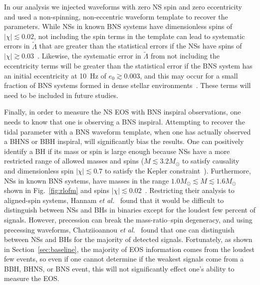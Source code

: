 \documentclass[twocolumn,prd,amssymb,aps,nofootinbib,showpacs,epsf]{revtex4}
\begin{document}

In our analysis we injected waveforms with zero NS spin and zero eccentricity and used a non-spinning, non-eccentric waveform template to recover the parameters. While NSs in known BNS systems have dimensionless spins of $|\chi| \lesssim 0.02$, not including the spin terms in the template can lead to systematic errors in $\tilde\Lambda$ that are greater than the statistical errors if the NSs have spins of $|\chi| \gtrsim 0.03$~\cite{Favata2014}. Likewise, the systematic error in $\tilde\Lambda$ from not including the eccentricity terms will be greater than the statistical error if the BNS system has an initial eccentricity at 10~Hz of $e_0 \gtrsim 0.003$, and this may occur for a small fraction of BNS systems formed in dense stellar environments~\cite{Favata2014}. These terms will need to be included in future studies.

Finally, in order to measure the NS EOS with BNS inspiral observations, one needs to know that one is observing a BNS inspiral. Attempting to recover the tidal parameter with a BNS waveform template, when one has actually observed a BHNS or BBH inspiral, will significantly bias the results. One can positively identify a BH if its mass or spin is large enough because NSs have a more restricted range of allowed masses and spins ($M \lesssim 3.2M_\odot$ to satisfy causality~\cite{RhoadesRuffini1974} and dimensionless spin $| \chi | \lesssim 0.7$ to satisfy the Kepler constraint~\cite{CookShapiroTeukolsky1994}). Furthermore, NSs in known BNS systems, have masses in the range $1.0M_\odot \lesssim M \lesssim 1.6M_\odot$ shown in Fig.~\ref{fig:rlofm} and spins $|\chi| \lesssim 0.02$~\cite{Favata2014}.  Restricting their analysis to aligned-spin systems, Hannam {\it et al.}~\cite{HannamBrownFairhurst2013} found that it would be difficult to distinguish between NSs and BHs in binaries except for the loudest few percent of signals. However, precession can break the mass-ratio--spin degeneracy, and using precessing waveforms, Chatziioannou {\it et al.}~\cite{ChatziioannouCornishKlein2014} found that one can distinguish between NSs and BHs for the majority of detected signals. Fortunately, as shown in Section~\ref{sec:baseline}, the majority of EOS information comes from the loudest few events, so even if one cannot determine if the weakest signals come from a BBH, BHNS, or BNS event, this will not significantly effect one's ability to measure the EOS.
\end{document}
